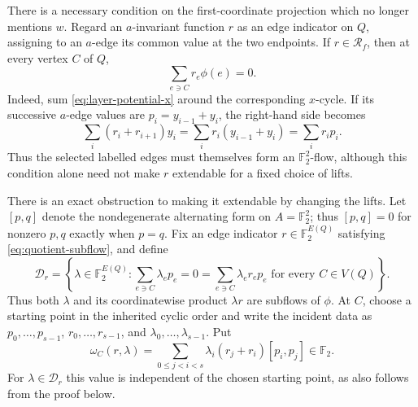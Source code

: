 \documentclass[11pt,a4paper]{article}
\theoremstyle{definition}
\theoremstyle{remark}
\begin{document}
There is a necessary condition on the first-coordinate projection which no longer mentions $w$.  Regard an $a$-invariant function $r$ as an edge indicator on $Q$, assigning to an $a$-edge its common value at the two endpoints.  If $r\in\mathcal R_f$, then at every vertex $C$ of $Q$,
\begin{equation}\label{eq:quotient-subflow}
 \sum_{e\ni C}r_e\phi(e)=0.
\end{equation}
Indeed, sum \eqref{eq:layer-potential-x} around the corresponding $x$-cycle.  If its successive $a$-edge values are $p_i=y_{i-1}+y_i$, the right-hand side becomes
\[
 \sum_i(r_i+r_{i+1})y_i=\sum_i r_i(y_{i-1}+y_i)=\sum_i r_i p_i.
\]
Thus the selected labelled edges must themselves form an $\mathbb F_2^2$-flow, although this condition alone need not make $r$ extendable for a fixed choice of lifts.

There is an exact obstruction to making it extendable by changing the lifts.  Let $[p,q]$ denote the nondegenerate alternating form on $A=\mathbb F_2^2$; thus $[p,q]=0$ for nonzero $p,q$ exactly when $p=q$.  Fix an edge indicator $r\in\mathbb F_2^{E(Q)}$ satisfying \eqref{eq:quotient-subflow}, and define
\[
 \mathcal D_r=\left\{\lambda\in\mathbb F_2^{E(Q)}:
 \sum_{e\ni C}\lambda_ep_e=0=\sum_{e\ni C}\lambda_er_ep_e
 \text{ for every }C\in V(Q)\right\}.
\]
Thus both $\lambda$ and its coordinatewise product $\lambda r$ are subflows of $\phi$.  At $C$, choose a starting point in the inherited cyclic order and write the incident data as $p_0,\ldots,p_{s-1}$, $r_0,\ldots,r_{s-1}$, and $\lambda_0,\ldots,\lambda_{s-1}$.  Put
\begin{equation}\label{eq:interlacement}
 \omega_C(r,\lambda)=
 \sum_{0\le j<i<s}\lambda_i(r_j+r_i)[p_i,p_j]\in\mathbb F_2.
\end{equation}
For $\lambda\in\mathcal D_r$ this value is independent of the chosen starting point, as also follows from the proof below.
\end{document}
